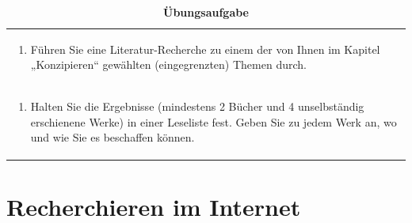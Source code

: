 \documentclass[]{book}
\providecommand{\tightlist}{%
  \setlength{\itemsep}{0pt}\setlength{\parskip}{0pt}}
\theoremstyle{definition}
\theoremstyle{definition}
\theoremstyle{definition}
\theoremstyle{remark}
\begin{document}
\begin{longtable}[]{@{}l@{}}
\caption{\textbf{\label{tab:aufgabe2-test} Übungsaufgabe}}\tabularnewline
\toprule
\begin{minipage}[t]{0.97\columnwidth}\raggedright\strut
\begin{enumerate}
\def\labelenumi{\arabic{enumi}.}
\tightlist
\item
  Führen Sie eine Literatur-Recherche zu einem der von Ihnen im Kapitel
  „Konzipieren`` gewählten (eingegrenzten) Themen durch. \vspace{-6mm}
\end{enumerate}\strut
\end{minipage}\tabularnewline
\begin{minipage}[t]{0.97\columnwidth}\raggedright\strut
\begin{enumerate}
\def\labelenumi{\arabic{enumi}.}
\setcounter{enumi}{1}
\tightlist
\item
  Halten Sie die Ergebnisse (mindestens 2 Bücher und 4 unselbständig
  erschienene Werke) in einer Leseliste fest. Geben Sie zu jedem Werk
  an, wo und wie Sie es beschaffen können.
\end{enumerate}\strut
\end{minipage}\tabularnewline
\bottomrule
\end{longtable}

\chapter{Recherchieren im Internet}\label{recherchieren-im-internet}
\end{document}
